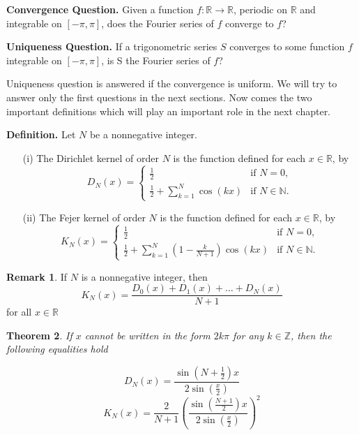 \documentclass[12pt]{amsart}
\newtheorem{theorem}{Theorem}[section]
\theoremstyle{definition}
\newtheorem{remark}[theorem]{Remark}
\begin{document}
\textbf{Convergence Question.} Given a function \( f : \mathbb{R} \to \mathbb{R} \), periodic on \( \mathbb{R} \) and integrable on \( [-\pi, \pi] \), does the Fourier series of \( f \) converge to \( f \)?


\textbf{Uniqueness Question.} If a trigonometric series \( S \) converges to some function \( f \) integrable on \( [-\pi, \pi] \), is S the Fourier series of \(f\)?


Uniqueness question is answered if the convergence is uniform. We will try to answer only the first questions in the next sections. Now comes the two important definitions which will play an important role in the next chapter.\footnotemark{}




\textbf{Definition.} Let $N$ be a nonnegative integer.
\begin{enumerate}
  \item[(i)] The Dirichlet kernel of order $N$ is the function defined for each $x \in \mathbb{R}$, by
  \[
  D_N(x) = \begin{cases}
            \frac{1}{2} & \text{if } N = 0, \\
            \frac{1}{2}  + \sum_{k=1}^{N} \cos(kx) & \text{if } N \in \mathbb{N}.
           \end{cases}
  \]

  \item[(ii)] The Fejer kernel of order $N$ is the function defined for each $x \in \mathbb{R}$, by
  \[
  K_N(x) = \begin{cases}
            \frac{1}{2} & \text{if } N = 0, \\
            \frac{1}{2} + \sum_{k=1}^{N}\left( 1 - \frac{k}{N + 1} \right)\cos(kx) & \text{if } N \in \mathbb{N}.
           \end{cases}
  \]
\end{enumerate}


\begin{remark}
    If $N$ is a nonnegative integer, then
\[
K_N(x) = \frac{D_0(x) + D_1(x) + \dots + D_N(x)}{N+1}
\]
for all $x \in \mathbb{R}$
\end{remark}


\begin{theorem}\label{non-series forms of kernels}
    If $x$ cannot be written in the form $2k\pi$ for any $k \in \mathbb{Z}$, then the following equalities hold

    \[
    D_N(x) = \frac{\sin(N + \frac{1}{2})x}{2\sin(\frac{x}{2})}
    \]
    \[
    K_N(x) = \frac{2}{N+1}(\frac{\sin(\frac{N + 1}{2})x}{2\sin(\frac{x}{2})})^2
    \]
\end{theorem}
\end{document}
